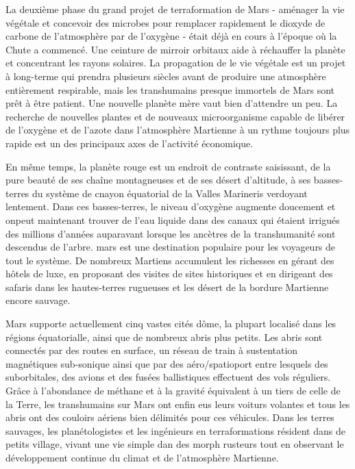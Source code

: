 La deuxième phase du grand projet de terraformation de Mars - aménager la vie végétale et concevoir des microbes pour remplacer rapidement le dioxyde de carbone de l'atmosphère par de l'oxygène - était déjà en cours à l'époque où la Chute a commencé. Une ceinture de mirroir orbitaux aide à réchauffer la planète et concentrant les rayons solaires. La propagation de le vie végétale est un projet à long-terme qui prendra plusieurs siècles avant de produire une atmosphère entièrement respirable, mais les transhumains presque immortels de Mars sont prêt à être patient. Une nouvelle planète mère vaut bien d'attendre un peu. La recherche de nouvelles plantes et de nouveaux microorganisme capable de libérer de l'oxygène et de l'azote dans l'atmosphère Martienne à un rythme toujours plus rapide est un des principaux axes de l'activité économique. 

En même temps, la planète rouge est un endroit de contraste saisissant, de la pure beauté de ses chaîne montagneuses et de ses désert d'altitude, à ses basses-terres du système de cnayon équatorial de la Valles Marineris verdoyant lentement. Dans ces basses-terres, le niveau d'oxygène augmente doucement et onpeut maintenant trouver de l'eau liquide dans des canaux qui étaient irrigués des millions d'années auparavant lorsque les ancètres de la transhumanité sont descendus de l'arbre. mars est une destination populaire pour les voyageurs de tout le système. De nombreux Martiens accumulent les richesses en gérant des hôtels de luxe, en proposant des visites de sites historiques et en dirigeant des safaris dans les hautes-terres rugueuses et les désert de la bordure Martienne encore sauvage. 

Mars supporte actuellement cinq vastes cités dôme, la plupart localisé dans les régions équatorialle, ainsi que de nombreux abris plus petits. Les abris sont connectés par des routes en surface, un réseau de train à sustentation magnétiques sub-sonique ainsi que par des aéro/spatioport entre lesquels des suborbitales, des avions et des fusées ballistiques effectuent des vols réguliers. Grâce à l'abondance de méthane et à la gravité équivalent à un tiers de celle de la Terre, les transhumains sur Mars ont enfin eus leurs voiturs volantes et tous les abris ont des couloirs aériens bien délimités pour ces véhicules. Dans les terres sauvages, les planétologistes et les ingénieurs en terraformations résident dans de petits village, vivant une vie simple dan des morph rusteurs tout en observant le développement continue du climat et de l'atmosphère Martienne. 


